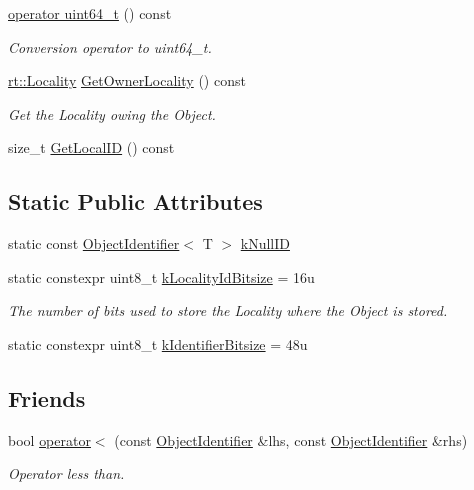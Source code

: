 \begin{DoxyCompactItemize}
\hyperlink{classshad_1_1ObjectIdentifier_a202421b63a4d0e8452a8a4103398838b}{operator uint64\-\_\-t} () const 
\begin{DoxyCompactList}\small\item\em Conversion operator to uint64\-\_\-t. \end{DoxyCompactList}\item 
\hyperlink{classshad_1_1rt_1_1Locality}{rt\-::\-Locality} \hyperlink{classshad_1_1ObjectIdentifier_a3ea730c2883ab93cd6b0e94c37762a02}{Get\-Owner\-Locality} () const 
\begin{DoxyCompactList}\small\item\em Get the Locality owing the Object. \end{DoxyCompactList}\item 
size\-\_\-t \hyperlink{classshad_1_1ObjectIdentifier_a2c8d03fd2f1b0bbc631d683e26ced97c}{Get\-Local\-I\-D} () const 
\end{DoxyCompactItemize}
\subsection*{Static Public Attributes}
\begin{DoxyCompactItemize}
\item 
static const \hyperlink{classshad_1_1ObjectIdentifier}{Object\-Identifier}$<$ T $>$ \hyperlink{classshad_1_1ObjectIdentifier_ad093d487f38c499b7de2de100adbce23}{k\-Null\-I\-D}
\item 
static constexpr uint8\-\_\-t \hyperlink{classshad_1_1ObjectIdentifier_abfcf5dac66fd514eea93f86c8c404de9}{k\-Locality\-Id\-Bitsize} = 16u
\begin{DoxyCompactList}\small\item\em The number of bits used to store the Locality where the Object is stored. \end{DoxyCompactList}\item 
static constexpr uint8\-\_\-t \hyperlink{classshad_1_1ObjectIdentifier_a39847f9a702ec3f943657650e05b0e02}{k\-Identifier\-Bitsize} = 48u
\end{DoxyCompactItemize}
\subsection*{Friends}
\begin{DoxyCompactItemize}
\item 
bool \hyperlink{classshad_1_1ObjectIdentifier_a216fb3ae16bb5981b80d2ad8df755d18}{operator$<$} (const \hyperlink{classshad_1_1ObjectIdentifier}{Object\-Identifier} \&lhs, const \hyperlink{classshad_1_1ObjectIdentifier}{Object\-Identifier} \&rhs)
\begin{DoxyCompactList}\small\item\em Operator less than. \end{DoxyCompactList}\end{DoxyCompactItemize}


